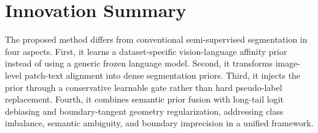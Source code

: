 \documentclass[journal,twoside]{IEEEtran}
\begin{document}
\section{Innovation Summary}
The proposed method differs from conventional semi-supervised segmentation in four aspects. First, it learns a dataset-specific vision-language affinity prior instead of using a generic frozen language model. Second, it transforms image-level patch-text alignment into dense segmentation priors. Third, it injects the prior through a conservative learnable gate rather than hard pseudo-label replacement. Fourth, it combines semantic prior fusion with long-tail logit debiasing and boundary-tangent geometry regularization, addressing class imbalance, semantic ambiguity, and boundary imprecision in a unified framework.
\end{document}
